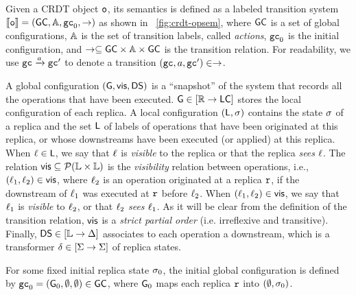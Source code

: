 Given a CRDT object $\mathtt{o}$, its semantics is defined as a labeled transition
system $\llbracket \mathtt{o} \rrbracket =
(\mathsf{GC},\mathbb{A},\mathtt{gc}_0,\rightarrow)$ as shown in
\figurename~\ref{fig:crdt-opsem}, where $\mathsf{GC}$ is a set of
global configurations, $\mathbb{A}$ is the set of transition labels, called \emph{actions},
$\mathtt{gc}_0$ is the initial configuration, and
$\rightarrow\subseteq \mathsf{GC} \times \mathbb{A}\times \mathsf{GC}$ is the
transition relation. For readability, we use $\mathtt{gc} \xrightarrow{a} \mathtt{gc}'$
to denote a transition $(\mathtt{gc},a,\mathtt{gc}')\in\rightarrow$.

A global configuration $(\mathsf{G}, \mathsf{vis}, \mathsf{DS})$ is a
``snapshot'' of the system that records all the operations that have
been executed.
$\mathsf{G} \in [\mathbb{R} \rightarrow \mathsf{LC}]$ stores the local
configuration of each replica.
A local configuration $(\mathsf{L}, \sigma)$ contains the state
$\sigma$ of a replica and the set $\mathsf{L}$ of labels of
operations that have been originated at this replica, or whose
downstreams have been executed (or applied) at this replica.
When $\ell\in \mathsf{L}$, we say that $\ell$ is \emph{visible}
to the replica or that the replica \emph{sees} $\ell$.
The relation $\mathsf{vis}\subseteq \mathcal{P}(\mathbb{L} \times \mathbb{L})$ is
the \emph{visibility} relation between operations, i.e.,
$(\ell_1,\ell_2)\in \mathsf{vis}$, where $\ell_2$ is an operation
originated at a replica $\mathtt{r}$, if the downstream of $\ell_1$ was
executed at $\mathtt{r}$ before $\ell_2$.
When $(\ell_1,\ell_2)\in \mathsf{vis}$, we say that $\ell_1$ is
\emph{visible} to $\ell_2$, or that $\ell_2$ \emph{sees}
$\ell_1$.
As it will be clear from the definition of the transition relation,
$\mathsf{vis}$ is a \emph{strict partial order} (i.e. irreflexive and transitive).
Finally, $\mathsf{DS}\in [\mathbb{L} \rightarrow \Delta]$ associates to
each operation a downstream, which is a transformer $\delta\in
[\Sigma \rightarrow \Sigma]$ of replica states.

For some fixed initial replica state $\sigma_0$, the initial global configuration is defined by $\mathtt{gc}_0 = (\mathsf{G}_0, \emptyset, \emptyset) \in \mathsf{GC}$, where $\mathsf{G}_0$ maps each replica $\mathtt{r}$ into $(\emptyset, \sigma_0)$.



